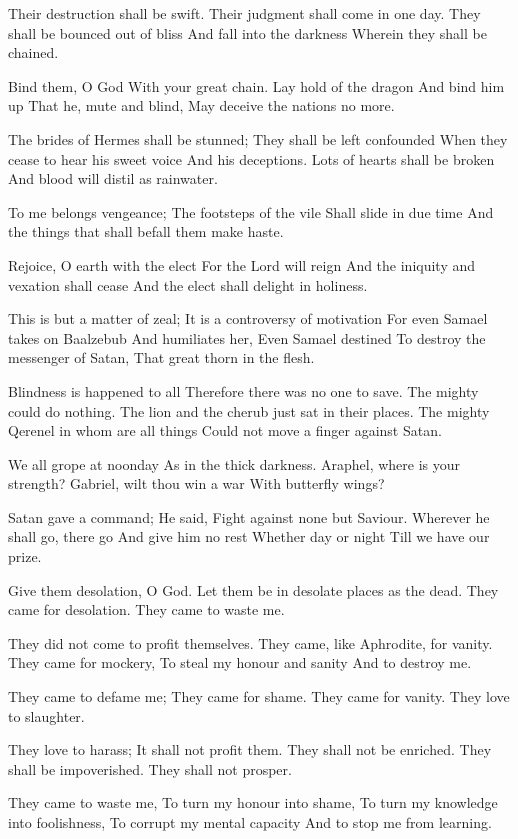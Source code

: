 \documentclass[
]{book}
\begin{document}
Their destruction shall be swift.
Their judgment shall come in one day.
They shall be bounced out of bliss
And fall into the darkness
Wherein they shall be chained.

Bind them, O God
With your great chain.
Lay hold of the dragon
And bind him up
That he, mute and blind,
May deceive the nations no more.

The brides of Hermes shall be stunned;
They shall be left confounded
When they cease to hear his sweet voice
And his deceptions.
Lots of hearts shall be broken
And blood will distil as rainwater.

To me belongs vengeance;
The footsteps of the vile
Shall slide in due time
And the things that shall befall them make haste.

Rejoice, O earth with the elect
For the Lord will reign
And the iniquity and vexation shall cease
And the elect shall delight in holiness.

This is but a matter of zeal;
It is a controversy of motivation
For even Samael takes on Baalzebub
And humiliates her,
Even Samael destined
To destroy the messenger of Satan,
That great thorn in the flesh.

Blindness is happened to all
Therefore there was no one to save.
The mighty could do nothing.
The lion and the cherub just sat in their places.
The mighty Qerenel in whom are all things
Could not move a finger against Satan.

We all grope at noonday
As in the thick darkness.
Araphel, where is your strength?
Gabriel, wilt thou win a war
With butterfly wings?

Satan gave a command;
He said, Fight against none but Saviour.
Wherever he shall go, there go
And give him no rest
Whether day or night
Till we have our prize.

Give them desolation, O God.
Let them be in desolate places as the dead.
They came for desolation.
They came to waste me.

They did not come to profit themselves.
They came, like Aphrodite, for vanity.
They came for mockery,
To steal my honour and sanity
And to destroy me.

They came to defame me;
They came for shame.
They came for vanity.
They love to slaughter.

They love to harass;
It shall not profit them.
They shall not be enriched.
They shall be impoverished.
They shall not prosper.

They came to waste me,
To turn my honour into shame,
To turn my knowledge into foolishness,
To corrupt my mental capacity
And to stop me from learning.
\end{document}
